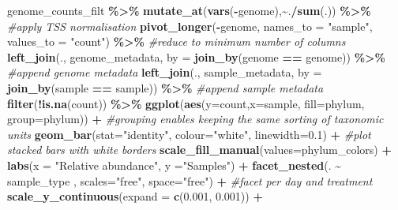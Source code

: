 \documentclass[
]{book}
\newenvironment{Shaded}{\begin{snugshade}}{\end{snugshade}}
\newcommand{\AttributeTok}[1]{\textcolor[rgb]{0.13,0.29,0.53}{#1}}
\newcommand{\CommentTok}[1]{\textcolor[rgb]{0.56,0.35,0.01}{\textit{#1}}}
\newcommand{\FloatTok}[1]{\textcolor[rgb]{0.00,0.00,0.81}{#1}}
\newcommand{\FunctionTok}[1]{\textcolor[rgb]{0.13,0.29,0.53}{\textbf{#1}}}
\newcommand{\NormalTok}[1]{#1}
\newcommand{\SpecialCharTok}[1]{\textcolor[rgb]{0.81,0.36,0.00}{\textbf{#1}}}
\newcommand{\StringTok}[1]{\textcolor[rgb]{0.31,0.60,0.02}{#1}}
\begin{document}
\begin{Shaded}
\begin{Highlighting}[]
\NormalTok{genome\_counts\_filt }\SpecialCharTok{\%\textgreater{}\%}
  \FunctionTok{mutate\_at}\NormalTok{(}\FunctionTok{vars}\NormalTok{(}\SpecialCharTok{{-}}\NormalTok{genome),}\SpecialCharTok{\textasciitilde{}}\NormalTok{.}\SpecialCharTok{/}\FunctionTok{sum}\NormalTok{(.)) }\SpecialCharTok{\%\textgreater{}\%} \CommentTok{\#apply TSS normalisation}
  \FunctionTok{pivot\_longer}\NormalTok{(}\SpecialCharTok{{-}}\NormalTok{genome, }\AttributeTok{names\_to =} \StringTok{"sample"}\NormalTok{, }\AttributeTok{values\_to =} \StringTok{"count"}\NormalTok{) }\SpecialCharTok{\%\textgreater{}\%} \CommentTok{\#reduce to minimum number of columns}
  \FunctionTok{left\_join}\NormalTok{(., genome\_metadata, }\AttributeTok{by =} \FunctionTok{join\_by}\NormalTok{(genome }\SpecialCharTok{==}\NormalTok{ genome)) }\SpecialCharTok{\%\textgreater{}\%} \CommentTok{\#append genome metadata}
  \FunctionTok{left\_join}\NormalTok{(., sample\_metadata, }\AttributeTok{by =} \FunctionTok{join\_by}\NormalTok{(sample }\SpecialCharTok{==}\NormalTok{ sample)) }\SpecialCharTok{\%\textgreater{}\%} \CommentTok{\#append sample metadata}
  \FunctionTok{filter}\NormalTok{(}\SpecialCharTok{!}\FunctionTok{is.na}\NormalTok{(count)) }\SpecialCharTok{\%\textgreater{}\%}
  \FunctionTok{ggplot}\NormalTok{(}\FunctionTok{aes}\NormalTok{(}\AttributeTok{y=}\NormalTok{count,}\AttributeTok{x=}\NormalTok{sample, }\AttributeTok{fill=}\NormalTok{phylum, }\AttributeTok{group=}\NormalTok{phylum)) }\SpecialCharTok{+} \CommentTok{\#grouping enables keeping the same sorting of taxonomic units}
    \FunctionTok{geom\_bar}\NormalTok{(}\AttributeTok{stat=}\StringTok{"identity"}\NormalTok{, }\AttributeTok{colour=}\StringTok{"white"}\NormalTok{, }\AttributeTok{linewidth=}\FloatTok{0.1}\NormalTok{) }\SpecialCharTok{+} \CommentTok{\#plot stacked bars with white borders}
    \FunctionTok{scale\_fill\_manual}\NormalTok{(}\AttributeTok{values=}\NormalTok{phylum\_colors) }\SpecialCharTok{+}
    \FunctionTok{labs}\NormalTok{(}\AttributeTok{x =} \StringTok{"Relative abundance"}\NormalTok{, }\AttributeTok{y =}\StringTok{"Samples"}\NormalTok{) }\SpecialCharTok{+}
    \FunctionTok{facet\_nested}\NormalTok{(. }\SpecialCharTok{\textasciitilde{}}\NormalTok{ sample\_type ,  }\AttributeTok{scales=}\StringTok{"free"}\NormalTok{, }\AttributeTok{space=}\StringTok{"free"}\NormalTok{) }\SpecialCharTok{+} \CommentTok{\#facet per day and treatment}
    \FunctionTok{scale\_y\_continuous}\NormalTok{(}\AttributeTok{expand =} \FunctionTok{c}\NormalTok{(}\FloatTok{0.001}\NormalTok{, }\FloatTok{0.001}\NormalTok{)) }\SpecialCharTok{+}

\end{Highlighting}
\end{Shaded}
\end{document}
